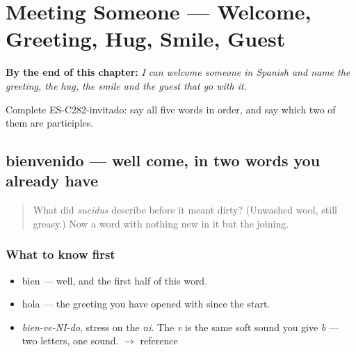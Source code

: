 
\chapter{Meeting Someone --- Welcome, Greeting, Hug, Smile, Guest}
\label{ch:encuentro}

\begin{chapteropening}
\textbf{By the end of this chapter:} \emph{I can welcome someone in Spanish and name the greeting, the hug, the smile and the guest that go with it.}

Complete ES-C282-invitado: say all five words in order, and say which two of them are participles.
\end{chapteropening}

\section[bienvenido]{bienvenido — well come, in two words you already have}

\label{lesson:ES-C282-bienvenido}



\begin{quote}
What did \emph{sucidus} describe before it meant dirty? (Unwashed wool, still greasy.) Now a word with nothing new in it but the joining.
\end{quote}

\subsection*{What to know first}
\begin{itemize}
\raggedright
  \item bien — well, and the first half of this word.
  \item hola — the greeting you have opened with since the start.
\end{itemize}

\begin{sounds}
\begin{itemize}
\raggedright
  \item \emph{bien-ve-NI-do}, stress on the \emph{ni}. The \emph{v} is the same soft sound you give \emph{b} — two letters, one sound. $\to$ reference
\end{itemize}
\end{sounds}


